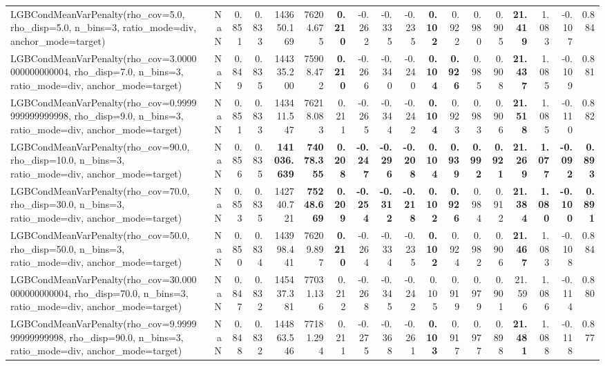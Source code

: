 \documentclass[11pt]{article}
\theoremstyle{plain}
\theoremstyle{definition}
\newcommand{\1}{\mathbf{1}}
\begin{document}
\begin{table}[htbp]
{\begin{tabular}{lrrrrrrrrrrrrrrrrr}
LGBCondMeanVarPenalty(rho\_cov=5.0, rho\_disp=5.0, n\_bins=3, ratio\_mode=div, anchor\_mode=target) & NaN & 0.851 & 0.833 & 143650.169 & 76204.675 & \textbf{0.210} & -0.262 & -0.335 & -0.235 & \textbf{0.102} & 0.922 & 0.980 & 0.905 & \textbf{21.419} & 1.083 & -0.107 & 0.884 \\
LGBCondMeanVarPenalty(rho\_cov=3.0000000000000004, rho\_disp=7.0, n\_bins=3, ratio\_mode=div, anchor\_mode=target) & NaN & 0.849 & 0.835 & 144335.200 & 75908.472 & \textbf{0.210} & -0.266 & -0.340 & -0.240 & \textbf{0.104} & \textbf{0.926} & 0.985 & 0.908 & \textbf{21.437} & 1.085 & -0.109 & 0.881 \\
LGBCondMeanVarPenalty(rho\_cov=0.9999999999999998, rho\_disp=9.0, n\_bins=3, ratio\_mode=div, anchor\_mode=target) & NaN & 0.851 & 0.833 & 143411.547 & 76218.083 & 0.211 & -0.265 & -0.344 & -0.242 & \textbf{0.104} & 0.923 & 0.983 & 0.906 & \textbf{21.518} & 1.085 & -0.110 & 0.882 \\
LGBCondMeanVarPenalty(rho\_cov=90.0, rho\_disp=10.0, n\_bins=3, ratio\_mode=div, anchor\_mode=target) & NaN & 0.856 & 0.835 & \textbf{141036.639} & \textbf{74078.355} & \textbf{0.208} & \textbf{-0.247} & \textbf{-0.296} & \textbf{-0.208} & \textbf{0.104} & \textbf{0.939} & \textbf{0.992} & \textbf{0.921} & \textbf{21.269} & \textbf{1.077} & \textbf{-0.092} & \textbf{0.893} \\
LGBCondMeanVarPenalty(rho\_cov=70.0, rho\_disp=30.0, n\_bins=3, ratio\_mode=div, anchor\_mode=target) & NaN & 0.853 & 0.835 & 142740.721 & \textbf{75248.669} & \textbf{0.209} & \textbf{-0.254} & \textbf{-0.312} & \textbf{-0.218} & \textbf{0.102} & \textbf{0.926} & 0.984 & 0.912 & \textbf{21.384} & \textbf{1.080} & \textbf{-0.100} & \textbf{0.891} \\
LGBCondMeanVarPenalty(rho\_cov=50.0, rho\_disp=50.0, n\_bins=3, ratio\_mode=div, anchor\_mode=target) & NaN & 0.850 & 0.834 & 143998.441 & 76209.897 & \textbf{0.210} & -0.264 & -0.334 & -0.235 & \textbf{0.102} & 0.924 & 0.982 & 0.906 & \textbf{21.467} & 1.083 & -0.108 & 0.884 \\
LGBCondMeanVarPenalty(rho\_cov=30.000000000000004, rho\_disp=70.0, n\_bins=3, ratio\_mode=div, anchor\_mode=target) & NaN & 0.847 & 0.832 & 145437.381 & 77031.136 & 0.212 & -0.268 & -0.345 & -0.242 & 0.105 & 0.919 & 0.979 & 0.901 & 21.596 & 1.086 & -0.114 & 0.880 \\
LGBCondMeanVarPenalty(rho\_cov=9.999999999999998, rho\_disp=90.0, n\_bins=3, ratio\_mode=div, anchor\_mode=target) & NaN & 0.848 & 0.832 & 144863.546 & 77181.294 & 0.211 & -0.275 & -0.368 & -0.261 & \textbf{0.103} & 0.917 & 0.977 & 0.898 & \textbf{21.481} & 1.088 & -0.118 & 0.877 \\

\end{tabular}}
\end{table}
\end{document}
